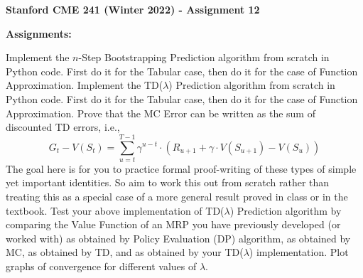 \documentclass[12pt]{exam}
\begin{document}
\begin{center}
{\large {\bf Stanford CME 241 (Winter 2022) - Assignment 12}}
\end{center}
 
{\large{\bf Assignments:}}
\begin{questions}
 Implement the $n$-Step Bootstrapping Prediction algorithm from scratch in Python code. First do it for the Tabular case, then do it for the case of Function Approximation.
\question Implement the TD($\lambda$) Prediction algorithm from scratch in Python code. First do it for the Tabular case, then do it for the case of Function Approximation.
\question Prove that the MC Error can be written as the sum of discounted TD errors, i.e.,
$$G_t - V(S_t) = \sum_{u=t}^{T-1} \gamma^{u-t} \cdot (R_{u+1} + \gamma \cdot V(S_{u+1}) - V(S_u))$$
The goal here is for you to practice formal proof-writing of these types of simple yet important identities. So aim to work this out from scratch rather than treating this as a special case of a more general result proved in class or in the textbook.
\question Test your above implementation of TD($\lambda$) Prediction algorithm by comparing the Value Function of an MRP you have previously developed (or worked with) as obtained by Policy Evaluation (DP) algorithm, as obtained by MC, as obtained by TD, and as obtained by your TD($\lambda$) implementation. Plot graphs of convergence for different values of $\lambda$.
\end{questions}
\end{document}
